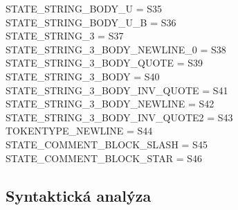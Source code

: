 \documentclass[12pt]{article}
\begin{document}
\begin{tiny}
\begin{multicols}{2}
    STATE\_STRING\_BODY\_U = S35\\
    STATE\_STRING\_BODY\_U\_B = S36\\
    STATE\_STRING\_3 = S37\\
    STATE\_STRING\_3\_BODY\_NEWLINE\_0 = S38\\
    STATE\_STRING\_3\_BODY\_QUOTE = S39\\
    STATE\_STRING\_3\_BODY = S40\\
    STATE\_STRING\_3\_BODY\_INV\_QUOTE = S41\\
    STATE\_STRING\_3\_BODY\_NEWLINE = S42\\
    STATE\_STRING\_3\_BODY\_INV\_QUOTE2 = S43\\
    TOKENTYPE\_NEWLINE = S44\\
    STATE\_COMMENT\_BLOCK\_SLASH = S45\\
    STATE\_COMMENT\_BLOCK\_STAR = S46\\
    \end{multicols}
\end{tiny}

\subsection{Syntaktická analýza}

\end{document}
